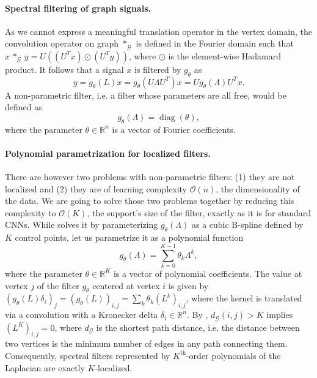 \documentclass{article}
\DeclareMathOperator*{\diag}{diag}
\newcommand{\G}{\mathcal{G}}
\newcommand{\bO}{\mathcal{O}}
\newcommand{\R}{\mathbb{R}}
\newcommand{\bruna}{art:BrunaZarembaSzlamLeCun13DLgraphs,
art:HenaffBrunaLeCun15DLgraphs}
\begin{document}
\paragraph{Spectral filtering of graph signals.} As we cannot express a
meaningful translation operator in the vertex domain, the convolution operator
on graph $\ast_\G$ is defined in the Fourier domain such that $x \,\ast_\G\, y =
U((U^Tx) \odot (U^Ty))$, where $\odot$ is the element-wise Hadamard product. It
follows that a signal $x$ is filtered by $g_\theta$ as
\begin{equation}
	y = g_\theta(L) x = g_\theta(U \Lambda U^T) x = U g_\theta(\Lambda) U^T x.
\end{equation}
A non-parametric filter, i.e. a filter whose parameters
are all free, would be defined as
\begin{equation} \label{eq:filt_non-param}
	g_\theta(\Lambda) = \diag(\theta),
\end{equation}
where the parameter $\theta \in \R^n$ is a vector of Fourier coefficients.

\paragraph{Polynomial parametrization for localized filters.} There are however
two problems with non-parametric filters: (1) they are not localized and (2)
they are of learning complexity $\bO(n)$, the dimensionality of the data. We are
going to solve those two problems together by reducing this complexity to
$\bO(K)$, the support's size of the filter, exactly as it is for standard CNNs.
While \cite{\bruna} solves it by parameterizing $g_\theta(\Lambda)$ as a cubic
B-spline defined by $K$ control points, let us parametrize it as a polynomial
function
\begin{equation} \label{eq:filt_poly}
	g_\theta(\Lambda) = \sum_{k=0}^{K-1} \theta_k \Lambda^k,
\end{equation}
where the parameter $\theta \in \R^K$ is a vector of polynomial coefficients.
The value at vertex $j$ of the filter $g_\theta$ centered at vertex $i$ is given
by $(g_\theta(L) \delta_i)_j = (g_\theta(L))_{i,j} = \sum_k \theta_k
(L^k)_{i,j}$, where the kernel is translated via a convolution with a Kronecker
delta $\delta_i \in \R^n$. By \cite[Lemma
5.2]{art:HammondVandergheynstGribonval11GraphWav}, $d_\G(i,j) > K$ implies
$(L^K)_{i,j} = 0$, where $d_\G$ is the shortest path distance, i.e. the distance
between two vertices is the minimum number of edges in any path connecting them.
Consequently, spectral filters represented by $K^\text{th}$-order polynomials of
the Laplacian are exactly $K$-localized.
\end{document}
